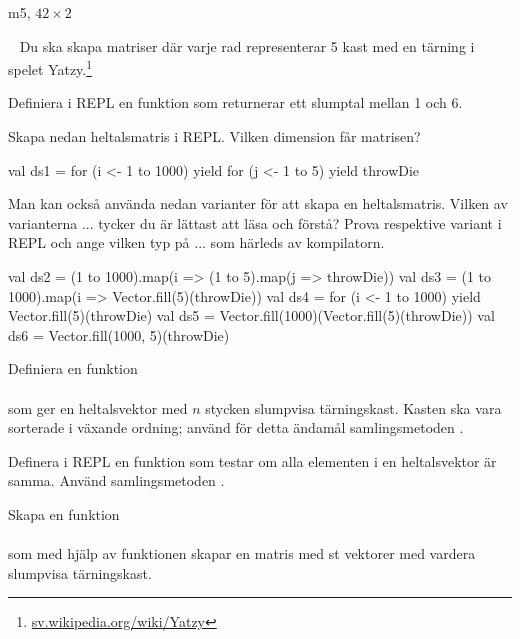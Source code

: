 \SubtaskSolved  m5, $42 \times 2$

\QUESTEND






\QUESTBEGIN

\Task  \label{matrices:task:yatzy} \what~  Du ska skapa matriser där varje rad representerar 5 kast med en tärning i spelet Yatzy.\footnote{\href{https://sv.wikipedia.org/wiki/Yatzy}{sv.wikipedia.org/wiki/Yatzy}}


\Subtask Definiera i REPL en funktion  som returnerar ett slumptal mellan 1 och 6.

\Subtask Skapa nedan heltalsmatris i REPL. Vilken dimension får matrisen?
\begin{REPL}
val ds1 = for (i <- 1 to 1000) yield {
            for (j <- 1 to 5) yield throwDie
          }
\end{REPL}

\Subtask Man kan också använda nedan varianter för att skapa en heltalsmatris. Vilken av varianterna  ...  tycker du är lättast att läsa och förstå? Prova respektive variant i REPL och ange vilken typ på  ...  som härleds av kompilatorn.
\begin{REPL}
val ds2 = (1 to 1000).map(i => (1 to 5).map(j => throwDie))
val ds3 = (1 to 1000).map(i => Vector.fill(5)(throwDie))
val ds4 = for (i <- 1 to 1000) yield Vector.fill(5)(throwDie)
val ds5 = Vector.fill(1000)(Vector.fill(5)(throwDie))
val ds6 = Vector.fill(1000, 5)(throwDie)
\end{REPL}


\Subtask Definiera en funktion \\ \\ som ger en heltalsvektor med $n$ stycken slumpvisa tärningskast. Kasten ska vara sorterade i växande ordning; använd för detta ändamål samlingsmetoden .


\Subtask \label{matrices:subtask:isyatzyforall} Definera i REPL en funktion  som testar om alla elementen i en heltalsvektor är samma. Använd samlingsmetoden .


\Subtask Skapa en funktion  \\  \\ som med hjälp av funktionen  skapar en matris med  st vektorer med vardera  slumpvisa tärningskast.


